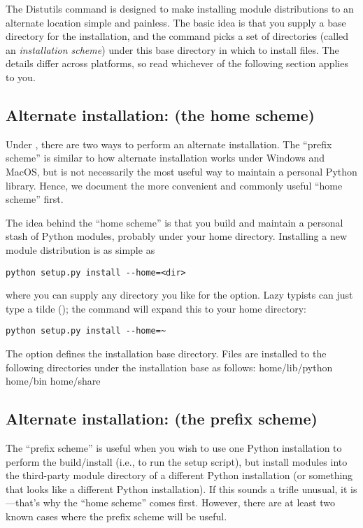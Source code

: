 \documentclass{howto}
\begin{document}
The Distutils  command is designed to make installing
module distributions to an alternate location simple and painless.  The
basic idea is that you supply a base directory for the installation, and
the  command picks a set of directories (called an
\emph{installation scheme}) under this base directory in which to
install files.  The details differ across platforms, so read whichever
of the following section applies to you.


\subsection{Alternate installation: \UNIX{} (the home scheme)}
\label{alt-install-prefix}

Under \UNIX, there are two ways to perform an alternate installation.
The ``prefix scheme'' is similar to how alternate installation works
under Windows and MacOS, but is not necessarily the most useful way to
maintain a personal Python library.  Hence, we document the more
convenient and commonly useful ``home scheme'' first.

The idea behind the ``home scheme'' is that you build and maintain a
personal stash of Python modules, probably under your home directory.
Installing a new module distribution is as simple as
\begin{verbatim}
python setup.py install --home=<dir>
\end{verbatim}
where you can supply any directory you like for the 
option.  Lazy typists can just type a tilde (\code{\textasciitilde}); the
 command will expand this to your home directory:
\begin{verbatim}
python setup.py install --home=~
\end{verbatim}

The  option defines the installation base
directory.  Files are installed to the following directories under the
installation base as follows:
              {home}{/lib/python}
              {home}{/bin}
              {home}{/share}

\subsection{Alternate installation: \UNIX{} (the prefix scheme)}
\label{alt-install-home}

The ``prefix scheme'' is useful when you wish to use one Python
installation to perform the build/install (i.e., to run the setup
script), but install modules into the third-party module directory of a
different Python installation (or something that looks like a different
Python installation).  If this sounds a trifle unusual, it is---that's
why the ``home scheme'' comes first.  However, there are at least two
known cases where the prefix scheme will be useful.
\end{document}
